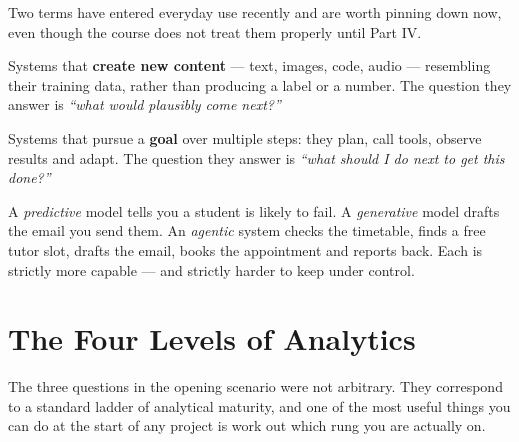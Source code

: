 Two terms have entered everyday use recently and are worth pinning down now, even
though the course does not treat them properly until Part IV.

\begin{definitionbox}[Generative AI]
Systems that \textbf{create new content} --- text, images, code, audio --- resembling
their training data, rather than producing a label or a number. The question they
answer is \emph{``what would plausibly come next?''}
\end{definitionbox}

\begin{definitionbox}[Agentic AI]
Systems that pursue a \textbf{goal} over multiple steps: they plan, call tools,
observe results and adapt. The question they answer is \emph{``what should I do
next to get this done?''}
\end{definitionbox}

\begin{conceptbox}
A \emph{predictive} model tells you a student is likely to fail. A
\emph{generative} model drafts the email you send them. An \emph{agentic} system
checks the timetable, finds a free tutor slot, drafts the email, books the
appointment and reports back. Each is strictly more capable --- and strictly
harder to keep under control.
\end{conceptbox}

\section{The Four Levels of Analytics}

The three questions in the opening scenario were not arbitrary. They correspond to
a standard ladder of analytical maturity, and one of the most useful things you can
do at the start of any project is work out which rung you are actually on.

